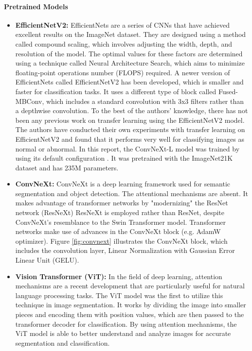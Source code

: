 \paragraph{Pretrained Models}
\begin{itemize}
    \item \textbf{EfficientNetV2:}
        EfficientNets \cite{tan2021efficientnetv2} are a series of CNNs that have achieved excellent results on the ImageNet \cite{krizhevsky2017imagenet} dataset. They are designed using a method called compound scaling, which involves adjusting the width, depth, and resolution of the model. The optimal values for these factors are determined using a technique called Neural Architecture Search, which aims to minimize floating-point operations number (FLOPS) required. A newer version of EfficientNets called  EfficientNetV2 \cite{tan2021efficientnetv2} has been developed, which is smaller and faster for classification tasks. It uses a different type of block called Fused-MBConv, which includes a standard convolution with 3x3 filters rather than a depthwise convolution. To the best of the authors' knowledge, there has not been any previous work on transfer learning using the EfficientNetV2 model. The authors have conducted their own experiments with transfer learning on EfficientNetV2 and found that it performs very well for classifying images as normal or abnormal.
        In this report, the ConvNeXt-L model was trained by using its default configuration . It was pretrained with the ImageNet21K dataset and has 235M parameters.
    \item \textbf{ConvNeXt:}
        ConvNeXt is a deep learning framework used for semantic segmentation and object detection.
        The attentional mechanisms are absent.
        It makes advantage of transformer networks by "modernizing" the ResNet network (ResNeXt) \cite{he2015deep}
        ResNeXt is employed rather than ResNet, despite ConvNeXt's resemblance to the Swin Transformer \cite{liu2021swin} model.
        Transformer networks make use of advances in the ConvNeXt block (e.g. AdamW optimizer).
        Figure \ref{fig:convnext} illustrates the ConvNeXt block, which includes the convolution layer, Linear Normalization with Gaussian Error Linear Unit (GELU).
    \item \textbf{Vision Transformer (ViT):}
        In the field of deep learning, attention mechanisms are a recent development that are particularly useful for natural language processing tasks. The ViT model was the first to utilize this technique in image segmentation. It works by dividing the image into smaller pieces and encoding them with position values, which are then passed to the transformer decoder for classification. By using attention mechanisms, the ViT model is able to better understand and analyze images for accurate segmentation and classification.

\end{itemize}
